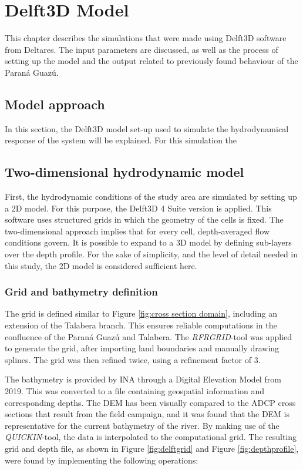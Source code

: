 \chapter{Delft3D Model}
\label{chap:Delft3DModel}
This chapter describes the simulations that were made using Delft3D software from Deltares. The input parameters are discussed, as well as the process of setting up the model and the output related to previously found behaviour of the Paraná Guazú. 

\section{Model approach}
In this section, the Delft3D model set-up used to simulate the hydrodynamical response of the system will be explained. For this simulation the 

\section{Two-dimensional hydrodynamic model}
First, the hydrodynamic conditions of the study area are simulated by setting up a 2D model. For this purpose, the Delft3D 4 Suite version is applied. This software uses structured grids in which the geometry of the cells is fixed. The two-dimensional approach implies that for every cell, depth-averaged flow conditions govern. It is possible to expand to a 3D model by defining sub-layers over the depth profile. For the sake of simplicity, and the level of detail needed in this study, the 2D model is considered sufficient here. 

\subsection{Grid and bathymetry definition}
\label{section:bathemetry}
The grid is defined similar to Figure \ref{fig:cross section domain}, including an extension of the Talabera branch. This ensures reliable computations in the confluence of the Paraná Guazú and Talabera. The \textit{RFRGRID}-tool was applied to generate the grid, after importing land boundaries and manually drawing splines. The grid was then refined twice, using a refinement factor of 3. 

The bathymetry is provided by INA through a Digital Elevation Model from 2019. This was converted to a file containing geospatial information and corresponding depths. The DEM has been visually compared to the ADCP cross sections that result from the field campaign, and it was found that the DEM is representative for the current bathymetry of the river. By making use of the \textit{QUICKIN}-tool, the data is interpolated to the computational grid. The resulting grid and depth file, as shown in Figure \ref{fig:delftgrid} and Figure \ref{fig:depthprofile}, were found by implementing the following operations:

